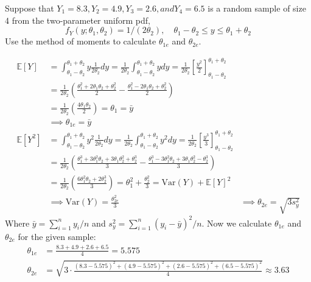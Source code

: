 \documentclass{article}
\newcommand{\E}{\mathbb{E}}
\newcommand{\V}{\text{Var}}
\begin{document}
\begin{probset}
\newpage

\begin{prob}[\textbf{5.2.21}]
    Suppose that $Y_1 = 8.3, Y_2 = 4.9, Y_3 = 2.6, and Y_4 = 6.5$ is a random sample of size 4 from the two-parameter uniform pdf, 
    \[
        f_Y(y; \theta_1, \theta_2) = 1/(2\theta_2), \quad \theta_1 - \theta_2 \leq y \leq \theta_1 + \theta_2
    \]
    Use the method of moments to calculate $\theta_{1e}$ and $\theta_{2e}$.

    \begin{soln}
        \begin{align*}
            \E[Y] &= \int_{\theta_1 - \theta_2}^{\theta_1 + \theta_2} y \frac{1}{2\theta_2} dy = \frac{1}{2\theta_2} \int_{\theta_1 - \theta_2}^{\theta_1 + \theta_2} y dy = \frac{1}{2\theta_2} \left[ \frac{y^2}{2} \right]_{\theta_1 - \theta_2}^{\theta_1 + \theta_2} \\
            &= \frac{1}{2\theta_2} \left( \frac{\theta_1^2 + 2\theta_1\theta_2 + \theta_2^2}{2} - \frac{\theta_1^2 - 2\theta_1\theta_2 + \theta_2^2}{2} \right) \\
            &= \frac{1}{2\theta_2} \left( \frac{4\theta_1\theta_2}{2} \right) = \theta_1 = \bar{y} \\
            &\implies \theta_{1e} = \bar{y} \\
            \E[Y^2] &= \int_{\theta_1 - \theta_2}^{\theta_1 + \theta_2} y^2 \frac{1}{2\theta_2} dy = \frac{1}{2\theta_2} \int_{\theta_1 - \theta_2}^{\theta_1 + \theta_2} y^2 dy = \frac{1}{2\theta_2} \left[ \frac{y^3}{3} \right]_{\theta_1 - \theta_2}^{\theta_1 + \theta_2} \\
            &= \frac{1}{2\theta_2} \left( \frac{\theta_1^3 + 3\theta_1^2\theta_2 + 3\theta_1\theta_2^2 + \theta_2^3}{3} - \frac{\theta_1^3 - 3\theta_1^2\theta_2 + 3\theta_1\theta_2^2 - \theta_2^3}{3} \right) \\
            &= \frac{1}{2\theta_2} \left( \frac{6\theta_1^2\theta_2 + 2\theta_2^3}{3} \right) = \theta_1^2 + \frac{\theta_2^2}{3} = \V(Y) + \E[Y]^2 \\
            &\implies \V(Y) = \frac{\theta_{2e}^2}{3} &\implies \theta_{2e} = \sqrt{3s_y^2}
        \end{align*}
        Where $\bar{y} = \sum_{i=1}^n y_i / n$ and $s_y^2 = \sum_{i=1}^n (y_i - \bar{y})^2 / n$. Now we calculate $\theta_{1e}$ and $\theta_{2e}$ for the given sample:
        \begin{align*}
            \theta_{1e} &= \frac{8.3 + 4.9 + 2.6 + 6.5}{4} = 5.575 \\
            \theta_{2e} &= \sqrt{3 \cdot \frac{(8.3 - 5.575)^2 + (4.9 - 5.575)^2 + (2.6 - 5.575)^2 + (6.5 - 5.575)^2}{4}} \approx 3.63
        \end{align*}
    \end{soln}
\end{prob}


\end{probset}
\end{document}
